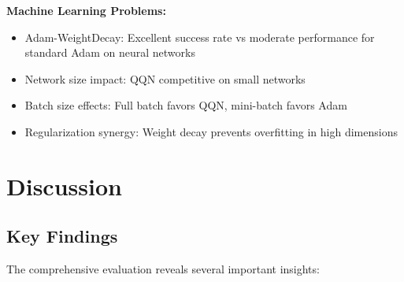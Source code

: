 \textbf{Machine Learning Problems:}

\begin{itemize}
\tightlist
\item
  Adam-WeightDecay: Excellent success rate vs moderate performance for standard Adam on neural networks
\item
  Network size impact: QQN competitive on small networks
\item
  Batch size effects: Full batch favors QQN, mini-batch favors Adam
\item
  Regularization synergy: Weight decay prevents overfitting in high dimensions
\end{itemize}

\hypertarget{discussion}{%
\section{Discussion}\label{discussion}}

\hypertarget{key-findings}{%
\subsection{Key Findings}\label{key-findings}}

The comprehensive evaluation reveals several important insights:

